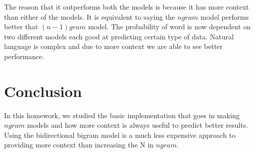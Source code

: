 \documentclass[10pt] {article}
\begin{document}
The reason that it outperforms both the models is because it has more context than either of the models. It is equivalent to saying the $ngram$ model performs better that $(n-1)gram$ model. The probability of word is now dependent on two different models each good at predicting certain type of data. Natural language is complex and due to more context we are able to see better performance.

\section{Conclusion}
In this homework, we studied the basic implementation that goes in making $ngram$ models and how more context is always useful to predict better results. Using the bidirectional bigram model is a much less expensive approach to providing more context than increasing the N in $ngram$.



\end{document}

